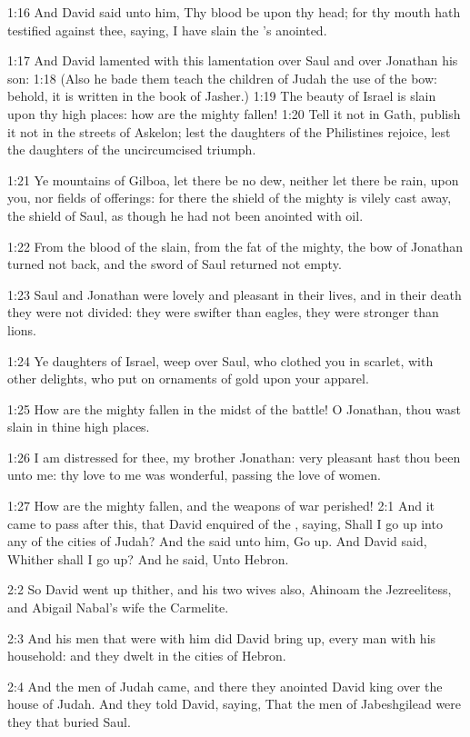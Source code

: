1:16 And David said unto him, Thy blood be upon thy head; for thy mouth hath testified against thee, saying, I have slain the \LORD's anointed.

1:17 And David lamented with this lamentation over Saul and over Jonathan his son: 1:18 (Also he bade them teach the children of Judah the use of the bow: behold, it is written in the book of Jasher.)  1:19 The beauty of Israel is slain upon thy high places: how are the mighty fallen!  1:20 Tell it not in Gath, publish it not in the streets of Askelon; lest the daughters of the Philistines rejoice, lest the daughters of the uncircumcised triumph.

1:21 Ye mountains of Gilboa, let there be no dew, neither let there be rain, upon you, nor fields of offerings: for there the shield of the mighty is vilely cast away, the shield of Saul, as though he had not been anointed with oil.

1:22 From the blood of the slain, from the fat of the mighty, the bow of Jonathan turned not back, and the sword of Saul returned not empty.

1:23 Saul and Jonathan were lovely and pleasant in their lives, and in their death they were not divided: they were swifter than eagles, they were stronger than lions.

1:24 Ye daughters of Israel, weep over Saul, who clothed you in scarlet, with other delights, who put on ornaments of gold upon your apparel.

1:25 How are the mighty fallen in the midst of the battle! O Jonathan, thou wast slain in thine high places.

1:26 I am distressed for thee, my brother Jonathan: very pleasant hast thou been unto me: thy love to me was wonderful, passing the love of women.

1:27 How are the mighty fallen, and the weapons of war perished!  2:1 And it came to pass after this, that David enquired of the \LORD, saying, Shall I go up into any of the cities of Judah? And the \LORD said unto him, Go up. And David said, Whither shall I go up? And he said, Unto Hebron.

2:2 So David went up thither, and his two wives also, Ahinoam the Jezreelitess, and Abigail Nabal's wife the Carmelite.

2:3 And his men that were with him did David bring up, every man with his household: and they dwelt in the cities of Hebron.

2:4 And the men of Judah came, and there they anointed David king over the house of Judah. And they told David, saying, That the men of Jabeshgilead were they that buried Saul.

